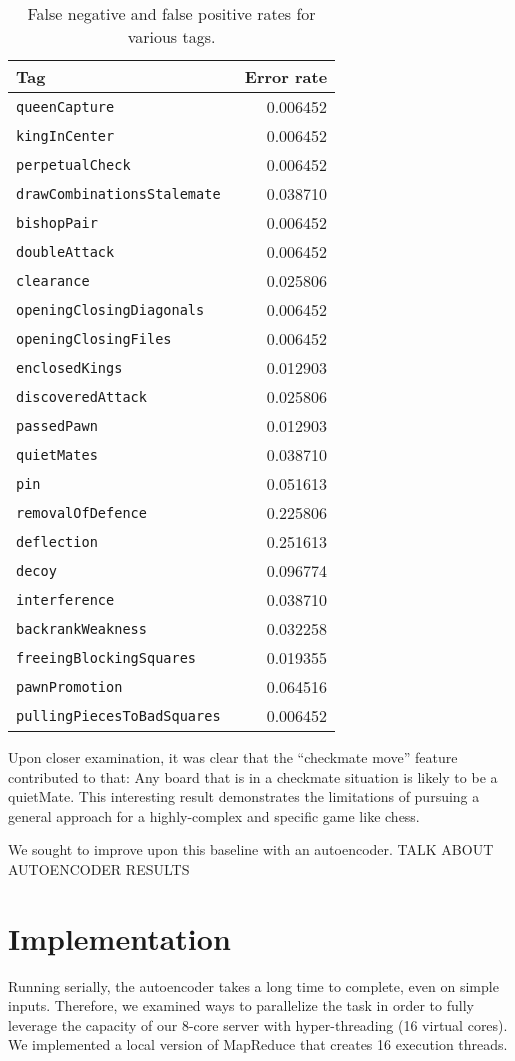 \documentclass[11pt]{article}
\begin{document}
\begin{table}
\begin{tabular}{lr}
\hline
\textbf{Tag} & \textbf{Error rate} \\ \hline
\tt{queenCapture}  & 0.006452 \\
\tt{kingInCenter}  & 0.006452 \\
\tt{perpetualCheck}  & 0.006452 \\
\tt{drawCombinationsStalemate}  & 0.038710 \\
\tt{bishopPair}  & 0.006452 \\
\tt{doubleAttack}  & 0.006452 \\
\tt{clearance}  & 0.025806 \\
\tt{openingClosingDiagonals}  & 0.006452 \\
\tt{openingClosingFiles}  & 0.006452 \\
\tt{enclosedKings}  & 0.012903 \\
\tt{discoveredAttack}  & 0.025806 \\
\tt{passedPawn}  & 0.012903 \\
\tt{quietMates}  & 0.038710 \\
\tt{pin}  & 0.051613 \\
\tt{removalOfDefence}  & 0.225806 \\
\tt{deflection}  & 0.251613 \\
\tt{decoy}  & 0.096774 \\
\tt{interference}  & 0.038710 \\
\tt{backrankWeakness}  & 0.032258 \\
\tt{freeingBlockingSquares}  & 0.019355 \\
\tt{pawnPromotion}  & 0.064516 \\
\tt{pullingPiecesToBadSquares}  & 0.006452
\end{tabular} 
\caption{False negative and false positive rates for various tags.}
\label{table:negatives}
\end{table}

Upon closer examination, it was clear that the “checkmate move” feature contributed to that: Any board that is in a checkmate situation is likely to be a quietMate. This interesting result demonstrates the limitations of pursuing a general approach for a highly-complex and specific game like chess.

We sought to improve upon this baseline with an autoencoder. TALK ABOUT AUTOENCODER RESULTS

\section{Implementation} %
Running serially, the autoencoder takes a long time to complete, even on simple inputs. Therefore, we examined ways to parallelize the task in order to fully leverage the capacity of our 8-core server with hyper-threading (16 virtual cores). We implemented a local version of MapReduce that creates 16 execution threads.
\end{document}
